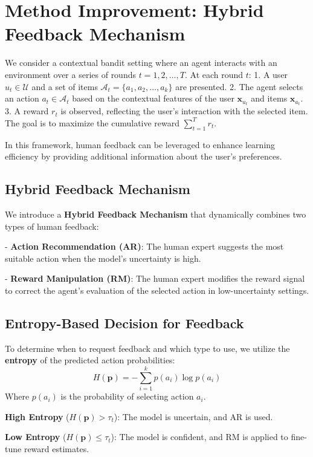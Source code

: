 
\section{Method Improvement: Hybrid Feedback Mechanism}

We consider a contextual bandit setting where an agent interacts with an environment over a series of rounds \(t = 1, 2, \dots, T\). At each round \(t\):
1. A user \(u_t \in \mathcal{U}\) and a set of items \(\mathcal{A}_t = \{a_1, a_2, \dots, a_k\}\) are presented.
2. The agent selects an action \(a_t \in \mathcal{A}_t\) based on the contextual features of the user \(\mathbf{x}_{u_t}\) and items \(\mathbf{x}_{a_t}\).
3. A reward \(r_t\) is observed, reflecting the user’s interaction with the selected item. The goal is to maximize the cumulative reward \(\sum_{t=1}^T r_t\).

In this framework, human feedback can be leveraged to enhance learning efficiency by providing additional information about the user's preferences.
\subsection{Hybrid Feedback Mechanism}

We introduce a \textbf{Hybrid Feedback Mechanism} that dynamically combines two types of human feedback:

- \textbf{Action Recommendation (AR)}: The human expert suggests the most suitable action when the model's uncertainty is high.

- \textbf{Reward Manipulation (RM)}: The human expert modifies the reward signal to correct the agent's evaluation of the selected action in low-uncertainty settings.

\subsection{Entropy-Based Decision for Feedback}

To determine when to request feedback and which type to use, we utilize the \textbf{entropy} of the predicted action probabilities:
\[
H(\mathbf{p}) = - \sum_{i=1}^{k} p(a_i) \log p(a_i)
\]
Where \(p(a_i)\) is the probability of selecting action \(a_i\).

\textbf{High Entropy} (\(H(\mathbf{p}) > \tau_t\)): The model is uncertain, and AR is used.

\textbf{Low Entropy} (\(H(\mathbf{p}) \leq \tau_t\)): The model is confident, and RM is applied to fine-tune reward estimates.

